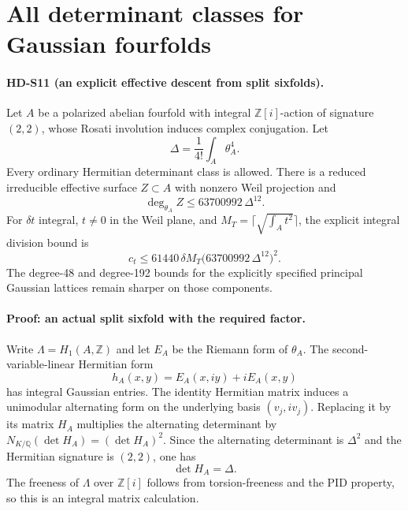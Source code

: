 \section{All determinant classes for Gaussian fourfolds}
\label{sec:gaussian-all-determinants}

\paragraph{HD-S11 (an explicit effective descent from split sixfolds).}
Let \(A\) be a polarized abelian fourfold with integral
\(\mathbb Z[i]\)-action of signature \((2,2)\), whose Rosati
involution induces complex conjugation. Let
\[
 \Delta=\frac1{4!}\int_A\theta_A^4.
\]
Every ordinary Hermitian determinant class is allowed.
There is a reduced irreducible effective surface \(Z\subset A\)
with nonzero Weil projection and
\[
 \boxed{\deg_{\theta_A}Z\le63700992\,\Delta^{12}.}             \tag{S11.1}
\]
For \(\delta t\) integral, \(t\ne0\) in the Weil plane, and
\(M_T=\lceil\sqrt{\int_A t^2}\rceil\), the explicit integral
division bound is
\[
 \boxed{c_t\le61440\,\delta M_T
       \bigl(63700992\,\Delta^{12}\bigr)^2.}                 \tag{S11.2}
\]
The degree-48 and degree-192 bounds for the explicitly specified
principal Gaussian lattices remain sharper on those components.

\paragraph{Proof: an actual split sixfold with the required factor.}
Write \(\Lambda=H_1(A,\mathbb Z)\) and let \(E_A\) be the Riemann
form of \(\theta_A\). The second-variable-linear Hermitian form
\[
 h_A(x,y)=E_A(x,iy)+iE_A(x,y)
\]
has integral Gaussian entries. The identity Hermitian matrix
induces a unimodular alternating form on the underlying basis
\((v_j,iv_j)\). Replacing it by its matrix \(H_A\) multiplies the
alternating determinant by
\(N_{K/\mathbb Q}(\det H_A)=(\det H_A)^2\).
Since the alternating determinant is \(\Delta^2\) and the
Hermitian signature is \((2,2)\), one has
\[
 \det H_A=\Delta.                                         \tag{S11.3}
\]
The freeness of \(\Lambda\) over \(\mathbb Z[i]\) follows from
torsion-freeness and the PID property, so this is an integral
matrix calculation.

